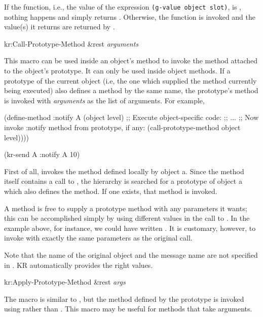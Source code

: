If the function, i.e., the value of the expression {\tt (g-value object
slot)}, is \value{NIL}, nothing happens and  simply returns
\value{NIL}.  Otherwise, the function is invoked and the value(s) it
returns are returned by .



\value{f-top}
\begin{example}
kr:Call-Prototype-Method \&rest {\it arguments}\value{macro}
\end{example}

This macro can be used inside an object's method to invoke the method
attached to the object's prototype.  It can only be used inside object
methods.  If a prototype of the current object (i.e, the one which supplied
the method currently being executed) also defines a method by the same
name, the prototype's method is invoked with {\it arguments} as the list of
arguments.  For example,
\begin{programexample}
(define-method :notify A (object level)
  ;; Execute object-specific code:
  ;; ...
  ;; Now invoke :notify method from prototype, if any:
  (call-prototype-method object level))))

(kr-send A :notify A 10)
\end{programexample}
First of all,  invokes the method defined locally by object
{\sc a}.  Since the method itself contains a call to
, the hierarchy is searched for a prototype
of object {\sc a} which also defines the  method.  If one exists,
that method is invoked.

A method is free to supply a prototype method with any parameters it
wants; this can be accomplished simply by using different values in the
call to .  In the example above, for instance, we
could have written .  It is
customary, however, to invoke  with exactly the
same parameters as the original call.

Note that the name of the original object and the message name are not
specified in .  KR automatically provides the
right values.


\value{f-top}
\begin{example}
kr:Apply-Prototype-Method \&rest {\it args}\value{macro}
\end{example}

The macro  is similar to
, but the method defined by the prototype is
invoked using  rather than .  This macro may be
useful for methods that take  arguments.



